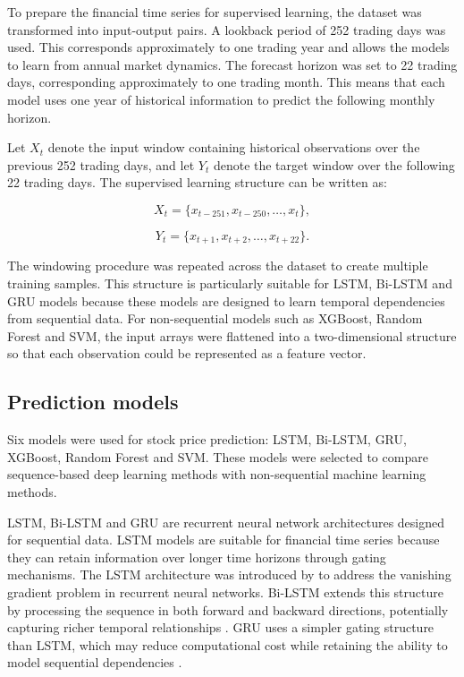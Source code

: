To prepare the financial time series for supervised learning, the dataset was transformed into input-output pairs. A lookback period of 252 trading days was used. This corresponds approximately to one trading year and allows the models to learn from annual market dynamics. The forecast horizon was set to 22 trading days, corresponding approximately to one trading month. This means that each model uses one year of historical information to predict the following monthly horizon.

Let $X_t$ denote the input window containing historical observations over the previous 252 trading days, and let $Y_t$ denote the target window over the following 22 trading days. The supervised learning structure can be written as:

\begin{equation}
X_t = \{x_{t-251}, x_{t-250}, \ldots, x_t\},
\end{equation}

\begin{equation}
Y_t = \{x_{t+1}, x_{t+2}, \ldots, x_{t+22}\}.
\end{equation}

The windowing procedure was repeated across the dataset to create multiple training samples. This structure is particularly suitable for LSTM, Bi-LSTM and GRU models because these models are designed to learn temporal dependencies from sequential data. For non-sequential models such as XGBoost, Random Forest and SVM, the input arrays were flattened into a two-dimensional structure so that each observation could be represented as a feature vector.

\subsection{Prediction models}

Six models were used for stock price prediction: LSTM, Bi-LSTM, GRU, XGBoost, Random Forest and SVM. These models were selected to compare sequence-based deep learning methods with non-sequential machine learning methods.

LSTM, Bi-LSTM and GRU are recurrent neural network architectures designed for sequential data. LSTM models are suitable for financial time series because they can retain information over longer time horizons through gating mechanisms. The LSTM architecture was introduced by \citet{hochreiter1997long} to address the vanishing gradient problem in recurrent neural networks. Bi-LSTM extends this structure by processing the sequence in both forward and backward directions, potentially capturing richer temporal relationships \citep{schuster1997bidirectional}. GRU uses a simpler gating structure than LSTM, which may reduce computational cost while retaining the ability to model sequential dependencies \citep{cho2014learning}.

